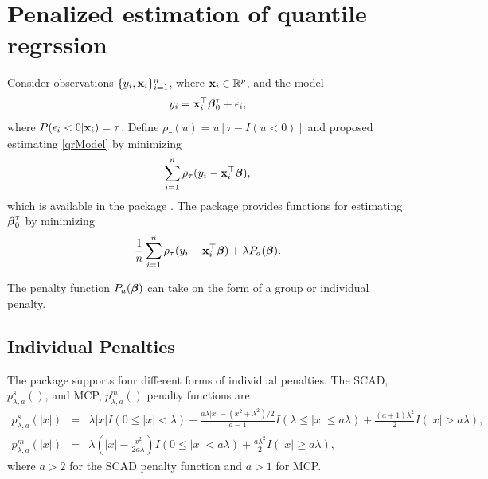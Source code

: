 \documentclass[article]{rqPenVignette}%
\newcommand{\vx}{{\bf x}}
\newcommand{\vbeta}{\mbox{\boldmath $\beta$}}
\newcommand{\Real}{\mathbb{R}}
\begin{document}


\section{Penalized estimation of quantile regrssion} \label{sec:models}
Consider observations $\{y_i,\vx_i\}_{i=1}^n$, where $\vx_i \in \Real^p$, and the model
\begin{equation}
\label{qrModel}
y_i = \vx_i^\top \vbeta^{\tau}_0 + \epsilon_i,
\end{equation}
where $P(\epsilon_i < 0 | \vx_i)=\tau$. Define $\rho_\tau(u) = u[\tau-I(u<0)]$ and \citet{origQR} proposed estimating \eqref{qrModel} by minimizing
\begin{equation}
\label{qr}
\sum_{i=1}^n \rho_\tau(y_i-\vx_i^\top\vbeta),
\end{equation}
which is available in the package . The package  provides functions for estimating $\vbeta^\tau_0$ by minimizing 
\begin{equation*}
\frac{1}{n} \sum_{i=1}^n \rho_\tau(y_i - \vx_i^\top\vbeta) + \lambda P_a(\vbeta).
\end{equation*}

The penalty function $P_a(\vbeta)$ can take on the form of a group or individual penalty. 

\subsection{Individual Penalties}

The package  supports four different forms of individual penalties. The SCAD, $p^s_{\lambda,a}()$, and MCP, $p^m_{\lambda,a}()$ penalty functions are 
\begin{eqnarray*}
p^s_{\lambda,a}(|x|) &=& \lambda|x|I(0 \leq |x| < \lambda) + \frac{a\lambda|x|-(x^2+\lambda^2)/2}{a-1}I(\lambda \leq |x| \leq a\lambda) + \frac{(a+1)\lambda^2}{2}I(|x|>a\lambda),  \\
p^m_{\lambda,a}(|x|) &=& \lambda(|x|-\frac{x^2}{2a\lambda})I(0 \leq |x| < a\lambda) + \frac{a\lambda^2}{2}I(|x|\geq a\lambda),  
\end{eqnarray*}
where $a>2$ for the SCAD penalty function and $a>1$ for MCP. 
\end{document}
